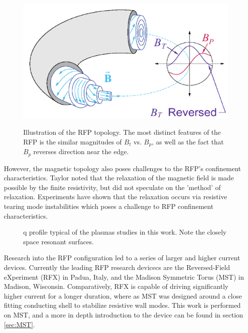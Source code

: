\begin{refsection}
\begin{figure}[!htb]
	\centering
	\includegraphics[width = 1.\linewidth]{./1_Introduction/RFP_mag_geometry.png}
	\label{fig:RFP_geometry}
	\caption[RFP magnetic topology]{Illustration of the RFP topology. The most distinct features of the RFP is the similar magnitudes of $B_t$ vs. $B_p$, as well as the fact that $B_p$ reverses direction near the edge.}
\end{figure}%

However, the magnetic topology also poses challenges to the RFP's confinement
characteristics. Taylor noted that the relaxation of the magnetic field is made
possible by the finite resistivity, but did not speculate on the 'method' of
relaxation. Experiments have shown that the relaxation occurs via resistive
tearing mode instabilities which poses a challenge to RFP confinement
characteristics.

\begin{figure}
	\centering
    \label{fig:q_profile}
    
    \caption[Example RPF q profile]{q profile typical of the plasmas studies in this work. Note the closely space resonant surfaces.}

\end{figure}

Research into the RFP configuration led to a series of larger and higher current devices. Currently the leading RFP research devicecs are the Reversed-Field eXperiment\cite{Bartiromo1999RecentExperiment} (RFX) in Padua, Italy, and the Madison Symmetric Torus\cite{Dexter1991} (MST) in Madison, Wisconsin. Comparatively, RFX is capable of driving significantly higher current for a longer duration, where as MST was designed around a close fitting conducting shell to stabilize resistive wall modes. This work is performed on MST, and a more in depth introduction to the device can be found in section \ref{sec:MST}.


\end{refsection}
